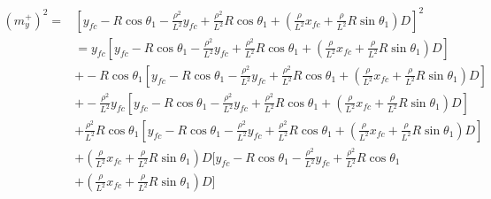 \documentclass[12pt]{article}
\begin{document}
\begin{align}
    (m^+_y)^2 =& [y_{fc} -R\cos\theta_1 -\frac{\rho^2}{L^2}y_{fc}+\frac{\rho^2}{L^2}R\cos\theta_1 + (\frac{\rho}{L^2}x_{fc} + \frac{\rho}{L^2}R\sin\theta_1)D]^2\\
    &= y_{fc}[y_{fc} -R\cos\theta_1 -\frac{\rho^2}{L^2}y_{fc}+\frac{\rho^2}{L^2}R\cos\theta_1 + (\frac{\rho}{L^2}x_{fc} + \frac{\rho}{L^2}R\sin\theta_1)D] \nonumber\\
    &+ -R\cos\theta_1[y_{fc} -R\cos\theta_1 -\frac{\rho^2}{L^2}y_{fc}+\frac{\rho^2}{L^2}R\cos\theta_1 + (\frac{\rho}{L^2}x_{fc} + \frac{\rho}{L^2}R\sin\theta_1)D] \nonumber\\
    &+ -\frac{\rho^2}{L^2}y_{fc}[y_{fc} -R\cos\theta_1 -\frac{\rho^2}{L^2}y_{fc}+\frac{\rho^2}{L^2}R\cos\theta_1 + (\frac{\rho}{L^2}x_{fc} + \frac{\rho}{L^2}R\sin\theta_1)D] \nonumber\\
    &+ \frac{\rho^2}{L^2}R\cos\theta_1[y_{fc} -R\cos\theta_1 -\frac{\rho^2}{L^2}y_{fc}+\frac{\rho^2}{L^2}R\cos\theta_1 + (\frac{\rho}{L^2}x_{fc} + \frac{\rho}{L^2}R\sin\theta_1)D] \nonumber\\
    &+ (\frac{\rho}{L^2}x_{fc} + \frac{\rho}{L^2}R\sin\theta_1)D[y_{fc} -R\cos\theta_1 -\frac{\rho^2}{L^2}y_{fc}+\frac{\rho^2}{L^2}R\cos\theta_1 \nonumber\\ &+ (\frac{\rho}{L^2}x_{fc} + \frac{\rho}{L^2}R\sin\theta_1)D]
\end{align}
\end{document}
